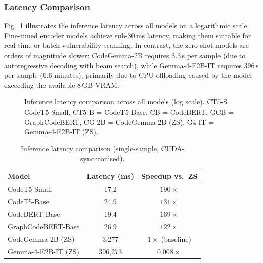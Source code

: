 \subsubsection{Latency Comparison}
Fig.~\ref{fig:latency_comparison} illustrates the inference latency across
all models on a logarithmic scale.  Fine-tuned encoder models achieve sub-30\,ms latency, making
them suitable for real-time or batch vulnerability scanning.  In contrast,
the zero-shot models are orders of magnitude slower: CodeGemma-2B requires
3.3\,s per sample (due to autoregressive decoding with beam search), while
Gemma-4-E2B-IT requires 396\,s per sample (6.6 minutes), primarily due to
CPU offloading caused by the model exceeding the available 8\,GB VRAM.

\begin{figure}[t]
\centering
{}
\caption{Inference latency comparison across all models (log scale).
         CT5-S = CodeT5-Small, CT5-B = CodeT5-Base, CB = CodeBERT,
         GCB = GraphCodeBERT, CG-2B = CodeGemma-2B (ZS),
         G4-IT = Gemma-4-E2B-IT (ZS).}
\label{fig:latency_comparison}
\end{figure}

\begin{table}[t]
\centering
\caption{Inference latency comparison (single-sample, CUDA-synchronised).}
\label{tab:latency}
\begin{tabular}{lcc}
\hline
\textbf{Model} & \textbf{Latency (ms)} & \textbf{Speedup vs.\ ZS} \\
\hline
CodeT5-Small       & 17.2   & $190\times$ \\
CodeT5-Base        & 24.9   & $131\times$ \\
CodeBERT-Base      & 19.4   & $169\times$ \\
GraphCodeBERT-Base & 26.9   & $122\times$ \\
\hline
CodeGemma-2B (ZS)      & 3,277   & $1\times$ (baseline) \\
Gemma-4-E2B-IT (ZS)    & 396,273 & $0.008\times$ \\
\hline
\end{tabular}
\end{table}

